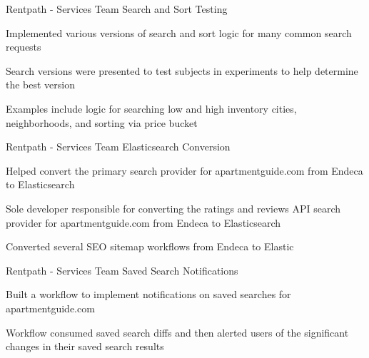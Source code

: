 
\begin{cventries}

\cventry
{Rentpath - Services Team} %
{Search and Sort Testing} %
{} %
{} %
{
	\begin{cvitems} %
		\item {Implemented various versions of search and sort logic for many common search requests}   
		\item {Search versions were presented to test subjects in experiments to help determine the best version}
		\item {Examples include logic for searching low and high inventory cities, neighborhoods, and sorting via price bucket} 
		\end{cvitems}
}

\cventry
{Rentpath - Services Team} %
{Elasticsearch Conversion} %
{} %
{} %
{
	\begin{cvitems} %
		\item {Helped convert the primary search provider for apartmentguide.com from Endeca to Elasticsearch}   
		\item {Sole developer responsible for converting the ratings and reviews API search provider for apartmentguide.com from Endeca to Elasticsearch}
		\item {Converted several SEO sitemap workflows from Endeca to Elastic} 
	\end{cvitems}
}

\cventry
{Rentpath - Services Team} %
{Saved Search Notifications} %
{} %
{} %
{
	\begin{cvitems} %
		\item {Built a workflow to implement notifications on saved searches for apartmentguide.com}   
		\item {Workflow consumed saved search diffs and then alerted users of the significant changes in their saved search results}
		\end{cvitems}
}


\end{cventries}
